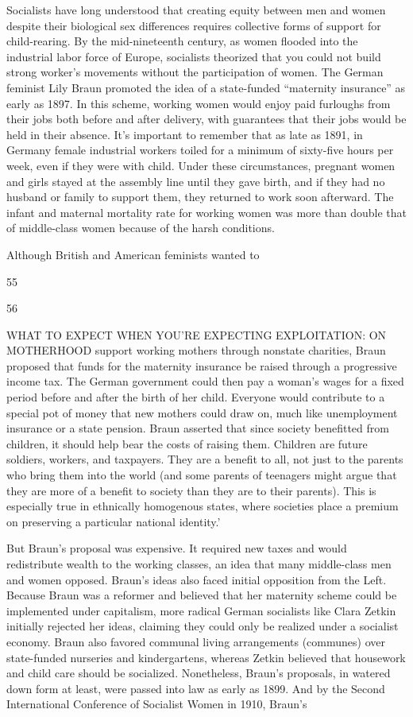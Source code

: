 Socialists have long understood that creating equity between men and women despite their biological sex differences requires collective forms of support for child-rearing. By the mid-nineteenth century, as women flooded into the industrial labor force of Europe, socialists theorized that you could not build strong worker’s movements without the participation of women. The German feminist Lily Braun promoted the idea of a state-funded “maternity insurance” as early as 1897. In this scheme, working women would enjoy paid furloughs from their jobs both before and after delivery, with guarantees that their jobs would be held in their absence. It’s important to remember that as late as 1891, in Germany female industrial workers toiled for a minimum of sixty-five hours per week, even if they were with child. Under these circumstances, pregnant women and girls stayed at the assembly line until they gave birth, and if they had no husband or family to support them, they returned to work soon afterward. The infant and maternal mortality rate for working women was more than double that of middle-class women because of the harsh conditions.
 \par 
Although British and American feminists wanted to
 \par 
55
 \par 
56
 \par 
WHAT TO EXPECT WHEN YOU'RE EXPECTING EXPLOITATION: ON MOTHERHOOD support working mothers through nonstate charities, Braun proposed that funds for the maternity insurance be raised through a progressive income tax. The German government could then pay a woman’s wages for a fixed period before and after the birth of her child. Everyone would contribute to a special pot of money that new mothers could draw on, much like unemployment insurance or a state pension. Braun asserted that since society benefitted from children, it should help bear the costs of raising them. Children are future soldiers, workers, and taxpayers. They are a benefit to all, not just to the parents who bring them into the world (and some parents of teenagers might argue that they are more of a benefit to society than they are to their parents). This is especially true in ethnically homogenous states, where societies place a premium on preserving a particular national identity.’
 \par 
But Braun’s proposal was expensive. It required new taxes and would redistribute wealth to the working classes, an idea that many middle-class men and women opposed. Braun’s ideas also faced initial opposition from the Left. Because Braun was a reformer and believed that her maternity scheme could be implemented under capitalism, more radical German socialists like Clara Zetkin initially rejected her ideas, claiming they could only be realized under a socialist economy. Braun also favored communal living arrangements (communes) over state-funded nurseries and kindergartens, whereas Zetkin believed that housework and child care should be socialized. Nonetheless, Braun’s proposals, in watered down form at least, were passed into law as early as 1899. And by the Second International Conference of Socialist Women in 1910, Braun’s
